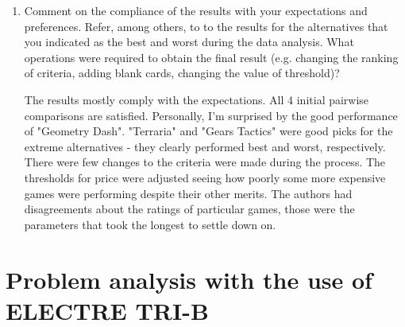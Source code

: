 \documentclass{article}
\begin{document}
\begin{enumerate}
    \item Comment on the compliance of the results with your expectations and preferences. Refer, among
    others, to to the results for the alternatives that you indicated as the best and worst during the data
    analysis. What operations were required to obtain the final result (e.g. changing the ranking of criteria,
    adding blank cards, changing the value of threshold)?

    The results mostly comply with the expectations.
    All 4 initial pairwise comparisons are satisfied. Personally, I'm surprised by the good performance of "Geometry Dash".
    "Terraria" and "Gears Tactics" were good picks for the extreme alternatives - they clearly performed best and worst, respectively.
    There were few changes to the criteria were made during the process. The thresholds for price were adjusted seeing how poorly some more expensive games were performing despite their other merits. The authors had disagreements about the ratings of particular games, those were the parameters that took the longest to settle down on.

    \end{enumerate}


\clearpage
\section{Problem analysis with the use of ELECTRE TRI-B}
\end{document}
